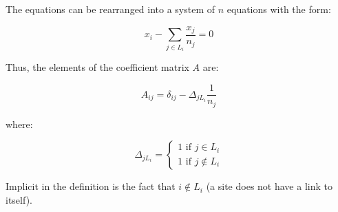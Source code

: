 \documentclass[12pt]{article}
\begin{document}


The equations can be rearranged into a system of $n$ equations with the form:

\begin{equation}
    x_{i} - \sum_{j \in L_{i}} \frac{x_{j}}{n_{j}} = 0
\end{equation}

Thus, the elements of the coefficient matrix $A$ are:

\begin{equation}
    A_{ij} = \delta_{ij} - \Delta_{jL_{i}} \frac{1}{n_{j}}
\end{equation}

where:

\begin{equation}
    \Delta_{jL_{i}} =
    \begin{cases}
        1 \text{ if } j \in L_{i} \\
        1 \text{ if } j \notin L_{i}
    \end{cases}
\end{equation}

Implicit in the definition is the fact that $i \notin L_{i}$ (a site does not have a link to itself).
\end{document}
